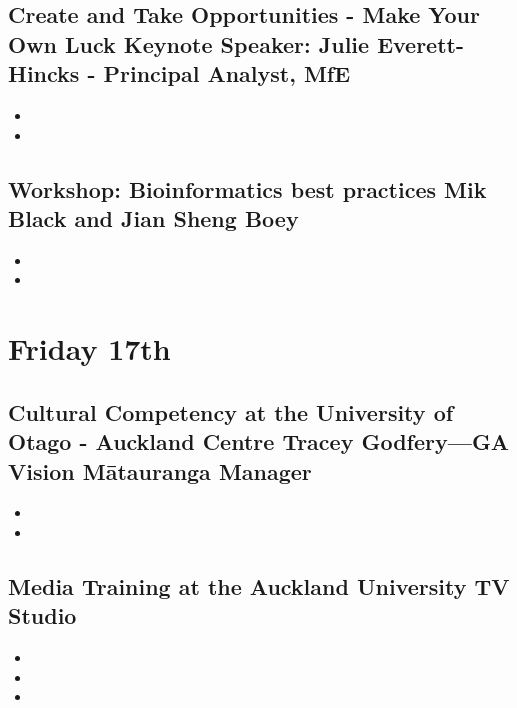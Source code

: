 \documentclass[document.tex]{subfiles}
\begin{document}
    \subsection{Create and Take Opportunities - Make Your Own Luck Keynote Speaker: Julie Everett-Hincks - Principal Analyst, MfE}
    \begin{itemize}
    \item 
    \item 
    \end{itemize}

    \subsection{Workshop: Bioinformatics best practices Mik Black and Jian Sheng Boey}
    \begin{itemize}
    \item 
    \item 
    \end{itemize}



\section*{Friday 17th}

    \subsection{Cultural Competency at the University of Otago - Auckland Centre Tracey Godfery—GA Vision Mātauranga Manager}
    \begin{itemize}
    \item 
    \item 
    \end{itemize}
    
    \subsection{Media Training at the Auckland University TV Studio}
    \begin{itemize}
    \item 
    \item 
    \item 
    \end{itemize}
    
    
\bib{}
    
\end{document}
